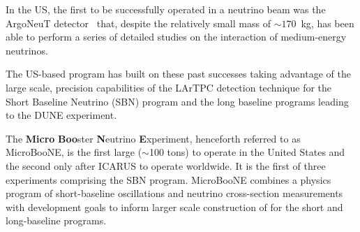 In the US, the first \lartpc to be successfully operated in a neutrino beam was the ArgoNeuT detector~\cite{Anderson:2012-argoneut} that, despite the relatively small mass of $\sim170$~kg, has been able to perform a series of detailed studies on the interaction of medium-energy neutrinos\cite{Acciarri:2013-argoneut-recomb,Anderson:2012-argoneut-CCincl,Acciarri:2014-argoneut-CCxsec,Acciarri:2014eit}.    



The US-based program has built on these past successes taking advantage of the large scale, precision capabilities of the LArTPC detection technique for the Short Baseline Neutrino (SBN) program and the long baseline programs leading to the DUNE experiment.

The {\bf{Micro}} {\bf{Boo}}ster {\bf{N}}eutrino {\bf{E}}xperiment, henceforth referred to as MicroBooNE, is the first large ($\sim$100 tons) \lartpc to operate in the United States and the second only after ICARUS to operate worldwide.   It is the first of three experiments comprising the SBN program.  MicroBooNE combines a physics program of short-baseline oscillations and neutrino cross-section measurements with development goals to inform larger scale construction of \lartpcs for the short and long-baseline programs.  


